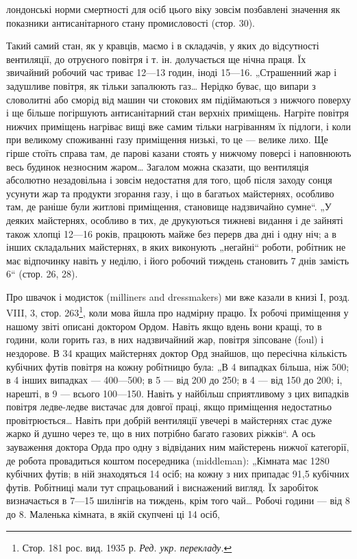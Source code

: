 \parcont{}  %
лондонські норми смертності для осіб цього віку зовсім позбавлені значення як показники
антисанітарного стану промисловості (стор. 30).

Такий самий стан, як у кравців, маємо і в складачів, у яких
до відсутності вентиляції, до отруєного повітря і т. ін. долучається ще нічна праця. Їх звичайний
робочий час триває
12—13 годин, іноді 15—16. „Страшенний жар і задушливе повітря, як тільки запалюють газ\dots{} Нерідко
буває, що випари
з словолитні або сморід від машин чи стокових ям підіймаються
з нижчого поверху і ще більше погіршують антисанітарний стан
верхніх приміщень. Нагріте повітря нижчих приміщень нагріває
вищі вже самим тільки нагріванням їх підлоги, і коли при великому споживанні газу приміщення низькі,
то це — велике лихо.
Ще гірше стоїть справа там, де парові казани стоять у нижчому
поверсі і наповнюють весь будинок незносним жаром\dots{} Загалом можна сказати, що вентиляція абсолютно
незадовільна
і зовсім недостатня для того, щоб після заходу сонця усунути
жар та продукти згорання газу, і що в багатьох майстернях,
особливо там, де раніше були житлові приміщення, становище
надзвичайно сумне“. „У деяких майстернях, особливо в тих,
де друкуються тижневі видання і де зайняті також хлопці 12—16 років, працюють майже без перерв два
дні і одну ніч; а в інших складальних майстернях, в яких виконують „негайні“ роботи,
робітник не має відпочинку навіть у неділю, і його робочий
тиждень становить 7 днів замість 6“ (стор. 26, 28).

Про швачок і модисток (milliners and dressmakers) ми вже
казали в книзі І, розд. VIII, 3, стор. 263\footnote*{Стор. 181 рос. вид. 1935 р. \emph{Ред. укр. перекладу.}}, коли мова йшла про
надмірну працю. Їх робочі приміщення у нашому звіті описані
доктором Ордом. Навіть якщо вдень вони кращі, то в години,
коли горить газ, в них надзвичайний жар, повітря зіпсоване (foul)
і нездорове. В 34 кращих майстернях доктор Орд знайшов, що
пересічна кількість кубічних футів повітря на кожну робітницю була: „В 4 випадках більша, ніж 500; в
4 інших випадках —
400—500; в 5 — від 200 до 250; в 4 — від 150 до 200; і, нарешті,
в 9 — всього 100—150. Навіть у найбільш сприятливому з цих
випадків повітря ледве-ледве вистачає для довгої праці, якщо
приміщення недостатньо провітрюється\dots{} Навіть при добрій вентиляції увечері в майстернях стає дуже
жарко й душно через
те, що в них потрібно багато газових ріжків“. А ось зауваження
доктора Орда про одну з відвіданих ним майстерень нижчої
категорії, де робота провадиться коштом посередника (middleman):
„Кімната має 1280 кубічних футів; в ній знаходяться
14 осіб; на кожну з них припадає 91,5 кубічних футів. Робітниці мали тут спрацьований і виснажений
вигляд. Їх заробіток
визначається в 7—15 шилінгів на тиждень, крім того чай\dots{} Робочі
години — від 8 до 8. Маленька кімната, в якій скупчені ці 14 осіб,
\parbreak{}  %
